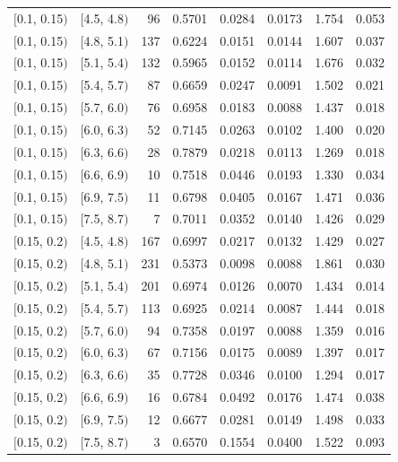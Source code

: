 \documentclass[11pt]{article}
\begin{document}
\begin{longtable}{| l | l | r | r | r | r | r | r |}
        $[$0.1, 0.15$)$ & $[$4.5, 4.8$)$ & 96 & 0.5701 & 0.0284 & 0.0173 & 1.754 & 0.053 \\
        $[$0.1, 0.15$)$ & $[$4.8, 5.1$)$ & 137 & 0.6224 & 0.0151 & 0.0144 & 1.607 & 0.037 \\
        $[$0.1, 0.15$)$ & $[$5.1, 5.4$)$ & 132 & 0.5965 & 0.0152 & 0.0114 & 1.676 & 0.032 \\
        $[$0.1, 0.15$)$ & $[$5.4, 5.7$)$ & 87 & 0.6659 & 0.0247 & 0.0091 & 1.502 & 0.021 \\
        $[$0.1, 0.15$)$ & $[$5.7, 6.0$)$ & 76 & 0.6958 & 0.0183 & 0.0088 & 1.437 & 0.018 \\
        $[$0.1, 0.15$)$ & $[$6.0, 6.3$)$ & 52 & 0.7145 & 0.0263 & 0.0102 & 1.400 & 0.020 \\
        $[$0.1, 0.15$)$ & $[$6.3, 6.6$)$ & 28 & 0.7879 & 0.0218 & 0.0113 & 1.269 & 0.018 \\
        $[$0.1, 0.15$)$ & $[$6.6, 6.9$)$ & 10 & 0.7518 & 0.0446 & 0.0193 & 1.330 & 0.034 \\
        $[$0.1, 0.15$)$ & $[$6.9, 7.5$)$ & 11 & 0.6798 & 0.0405 & 0.0167 & 1.471 & 0.036 \\
        $[$0.1, 0.15$)$ & $[$7.5, 8.7$)$ & 7 & 0.7011 & 0.0352 & 0.0140 & 1.426 & 0.029 \\
        $[$0.15, 0.2$)$ & $[$4.5, 4.8$)$ & 167 & 0.6997 & 0.0217 & 0.0132 & 1.429 & 0.027 \\
        $[$0.15, 0.2$)$ & $[$4.8, 5.1$)$ & 231 & 0.5373 & 0.0098 & 0.0088 & 1.861 & 0.030 \\
        $[$0.15, 0.2$)$ & $[$5.1, 5.4$)$ & 201 & 0.6974 & 0.0126 & 0.0070 & 1.434 & 0.014 \\
        $[$0.15, 0.2$)$ & $[$5.4, 5.7$)$ & 113 & 0.6925 & 0.0214 & 0.0087 & 1.444 & 0.018 \\
        $[$0.15, 0.2$)$ & $[$5.7, 6.0$)$ & 94 & 0.7358 & 0.0197 & 0.0088 & 1.359 & 0.016 \\
        $[$0.15, 0.2$)$ & $[$6.0, 6.3$)$ & 67 & 0.7156 & 0.0175 & 0.0089 & 1.397 & 0.017 \\
        $[$0.15, 0.2$)$ & $[$6.3, 6.6$)$ & 35 & 0.7728 & 0.0346 & 0.0100 & 1.294 & 0.017 \\
        $[$0.15, 0.2$)$ & $[$6.6, 6.9$)$ & 16 & 0.6784 & 0.0492 & 0.0176 & 1.474 & 0.038 \\
        $[$0.15, 0.2$)$ & $[$6.9, 7.5$)$ & 12 & 0.6677 & 0.0281 & 0.0149 & 1.498 & 0.033 \\
        $[$0.15, 0.2$)$ & $[$7.5, 8.7$)$ & 3 & 0.6570 & 0.1554 & 0.0400 & 1.522 & 0.093 \\

\end{longtable}
\end{document}
